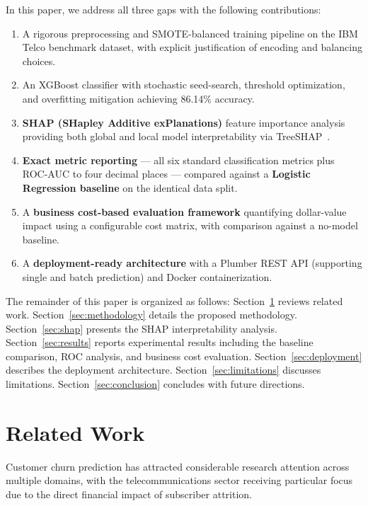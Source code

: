 \documentclass[10pt, conference, letterpaper]{IEEEtran}
\begin{document}
In this paper, we address all three gaps with the following contributions:
\begin{enumerate}
    \item A rigorous preprocessing and SMOTE-balanced training pipeline on the IBM Telco benchmark dataset, with explicit justification of encoding and balancing choices.
    \item An XGBoost classifier with stochastic seed-search, threshold optimization, and overfitting mitigation achieving 86.14\% accuracy.
    \item \textbf{SHAP (SHapley Additive exPlanations)} feature importance analysis providing both global and local model interpretability via TreeSHAP~\cite{lundberg2020treeshap}.
    \item \textbf{Exact metric reporting} --- all six standard classification metrics plus ROC-AUC to four decimal places --- compared against a \textbf{Logistic Regression baseline} on the identical data split.
    \item A \textbf{business cost-based evaluation framework} quantifying dollar-value impact using a configurable cost matrix, with comparison against a no-model baseline.
    \item A \textbf{deployment-ready architecture} with a Plumber REST API (supporting single and batch prediction) and Docker containerization.
\end{enumerate}

The remainder of this paper is organized as follows: Section~\ref{sec:related} reviews related work. Section~\ref{sec:methodology} details the proposed methodology. Section~\ref{sec:shap} presents the SHAP interpretability analysis. Section~\ref{sec:results} reports experimental results including the baseline comparison, ROC analysis, and business cost evaluation. Section~\ref{sec:deployment} describes the deployment architecture. Section~\ref{sec:limitations} discusses limitations. Section~\ref{sec:conclusion} concludes with future directions.

\section{Related Work}
\label{sec:related}

Customer churn prediction has attracted considerable research attention across multiple domains, with the telecommunications sector receiving particular focus due to the direct financial impact of subscriber attrition.
\end{document}
